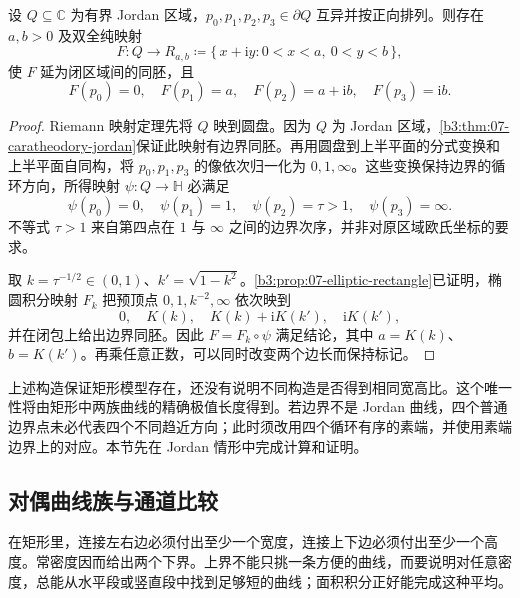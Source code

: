 \begin{proposition}[保持标记的矩形映射]\label{b3:prop:08-marked-rectangle-existence}
设 \(Q\subseteq\mathbb C\) 为有界 Jordan 区域，\(p_0,p_1,p_2,p_3\in\partial Q\) 互异并按正向排列。则存在 \(a,b>0\) 及双全纯映射
\[
 F:Q\longrightarrow R_{a,b}
 \coloneqq\{\,x+\mathrm{i}y:0<x<a,\ 0<y<b\,\},
\]
使 \(F\) 延为闭区域间的同胚，且
\[
 F(p_0)=0,\quad F(p_1)=a,\quad
 F(p_2)=a+\mathrm{i}b,\quad F(p_3)=\mathrm{i}b.
\]
\end{proposition}
\begin{proof}
Riemann 映射定理先将 \(Q\) 映到圆盘。因为 \(Q\) 为 Jordan 区域，\cref{b3:thm:07-caratheodory-jordan}保证此映射有边界同胚。再用圆盘到上半平面的分式变换和上半平面自同构，将 \(p_0,p_1,p_3\) 的像依次归一化为 \(0,1,\infty\)。这些变换保持边界的循环方向，所得映射 \(\psi:Q\rightarrow\mathbb H\) 必满足
\[
 \psi(p_0)=0,\quad\psi(p_1)=1,\quad
 \psi(p_2)=\tau>1,\quad\psi(p_3)=\infty.
\]
不等式 \(\tau>1\) 来自第四点在 \(1\) 与 \(\infty\) 之间的边界次序，并非对原区域欧氏坐标的要求。

取 \(k=\tau^{-1/2}\in(0,1)\)、\(k'=\sqrt{1-k^2}\)。\cref{b3:prop:07-elliptic-rectangle}已证明，椭圆积分映射 \(F_k\) 把预顶点 \(0,1,k^{-2},\infty\) 依次映到
\[
 0,\quad K(k),\quad K(k)+\mathrm{i}K(k'),\quad
 \mathrm{i}K(k'),
\]
并在闭包上给出边界同胚。因此 \(F=F_k\circ\psi\) 满足结论，其中 \(a=K(k)\)、\(b=K(k')\)。再乘任意正数，可以同时改变两个边长而保持标记。
\end{proof}

上述构造保证矩形模型存在，还没有说明不同构造是否得到相同宽高比。这个唯一性将由矩形中两族曲线的精确极值长度得到。若边界不是 Jordan 曲线，四个普通边界点未必代表四个不同趋近方向；此时须改用四个循环有序的素端，并使用素端边界上的对应。本节先在 Jordan 情形中完成计算和证明。

\subsection{对偶曲线族与通道比较}
\label{b3:subsec:080402}

在矩形里，连接左右边必须付出至少一个宽度，连接上下边必须付出至少一个高度。常密度因而给出两个下界。上界不能只挑一条方便的曲线，而要说明对任意密度，总能从水平段或竖直段中找到足够短的曲线；面积积分正好能完成这种平均。

